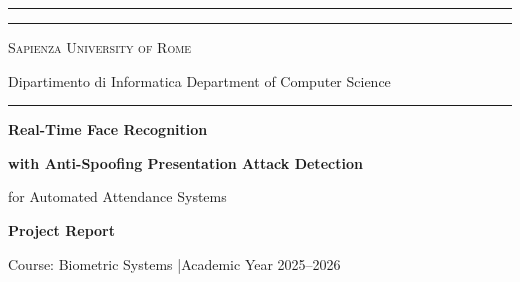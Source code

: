 \documentclass[10pt,a4paper]{article}
\begin{document}

\begin{titlepage}
\centering
\textcolor{sapblue}{\rule{\textwidth}{2pt}}
\vspace{0.15cm}
\textcolor{sapblue}{\rule{\textwidth}{0.4pt}}
\vspace{0.5cm}

{\scshape\large Sapienza University of Rome\par}
{\small\color{darkgray}Dipartimento di Informatica \textbullet{} Department of Computer Science\par}

\vspace{0.5cm}
\textcolor{sapblue}{\rule{\textwidth}{0.4pt}}
\vspace{0.8cm}

\begin{tcolorbox}[enhanced,colback=sapblue!6!white,colframe=sapblue,boxrule=2pt,arc=8pt,
  width=0.92\textwidth,halign=center,left=16pt,right=16pt,top=18pt,bottom=18pt,
  shadow={2mm}{-2mm}{0mm}{black!15}]
{\color{sapblue}\Large\bfseries Real-Time Face Recognition\par}
\vspace{5pt}
{\color{sapblue!70!black}\normalsize\bfseries with Anti-Spoofing Presentation Attack Detection\par}
\vspace{4pt}
{\color{darkgray}\small for Automated Attendance Systems\par}
\end{tcolorbox}

\vspace{0.8cm}
{\normalsize\bfseries Project Report\par}
{\small\color{darkgray}Course: Biometric Systems \quad|\quad Academic Year 2025--2026\par}


\end{titlepage}
\end{document}
